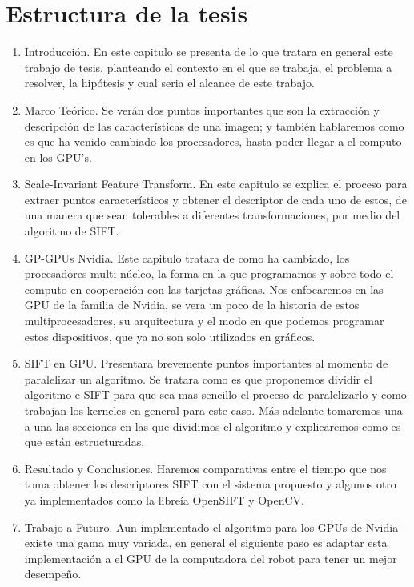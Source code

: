 \section{Estructura de la tesis}
\begin{enumerate}




\item Introducción. En este capitulo se presenta de lo que tratara en general este trabajo de tesis, planteando el contexto en el que se trabaja, el problema a resolver, la hipótesis y cual seria el alcance de este trabajo.\\

\item Marco Teórico. Se verán dos puntos importantes que son la extracción y descripción de las características de una imagen; y también hablaremos como es que ha venido cambiado los procesadores, hasta poder llegar a el computo en los GPU's.\\

\item Scale-Invariant Feature Transform. En este capitulo se explica el proceso para extraer puntos característicos y obtener el descriptor de cada uno de estos, de una manera que sean tolerables a diferentes transformaciones, por medio del algoritmo de SIFT.\\


\item GP-GPUs Nvidia.  Este capitulo tratara de como ha cambiado, los procesadores multi-núcleo, la forma en la que programamos y sobre todo el computo en cooperación con las tarjetas gráficas. Nos enfocaremos en las GPU de la familia de Nvidia, se vera un poco de la historia de estos multiprocesadores, su arquitectura y el modo en que podemos programar estos dispositivos, que ya no son solo utilizados en gráficos.\\


\item SIFT en GPU. Presentara brevemente puntos importantes al momento de paralelizar un algoritmo.
Se tratara como es que proponemos dividir el algoritmo e SIFT para que sea mas sencillo el proceso de paralelizarlo y como trabajan los kerneles en general para este caso.
Más adelante tomaremos una a una las secciones en las que dividimos el algoritmo y explicaremos como es que están estructuradas.\\


\item Resultado y Conclusiones. Haremos comparativas entre el tiempo que nos toma obtener los descriptores SIFT con el sistema propuesto y algunos otro ya implementados como la libreía OpenSIFT y OpenCV.\\

\item Trabajo a Futuro. Aun implementado el algoritmo para los GPUs de Nvidia existe una gama muy variada, en general el siguiente paso es adaptar esta implementación a el GPU de la computadora del robot para tener un mejor desempeño.\\

\end{enumerate}





